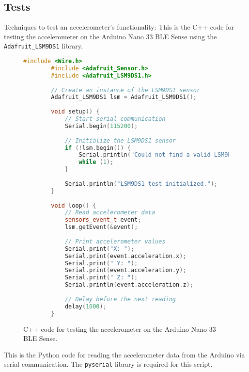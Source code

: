 \subsection{Tests}
Techniques to test an accelerometer’s functionality:
This is the C++ code for testing the accelerometer on the Arduino Nano 33 BLE Sense using the \texttt{Adafruit\_LSM9DS1} library. 

\begin{figure}[h!]
	\centering
	\begin{lstlisting}[style=pythonstyle ,language=C++, caption={Testing the accelerometer}, label={lst:arduino_accelerometer}]
		#include <Wire.h>
		#include <Adafruit_Sensor.h>
		#include <Adafruit_LSM9DS1.h>
		
		// Create an instance of the LSM9DS1 sensor
		Adafruit_LSM9DS1 lsm = Adafruit_LSM9DS1();
		
		void setup() {
			// Start serial communication
			Serial.begin(115200);
			
			// Initialize the LSM9DS1 sensor
			if (!lsm.begin()) {
				Serial.println("Could not find a valid LSM9DS1 sensor, check wiring!");
				while (1);
			}
			
			Serial.println("LSM9DS1 test initialized.");
		}
		
		void loop() {
			// Read accelerometer data
			sensors_event_t event;
			lsm.getEvent(&event);
			
			// Print accelerometer values
			Serial.print("X: ");
			Serial.print(event.acceleration.x);
			Serial.print(" Y: ");
			Serial.print(event.acceleration.y);
			Serial.print(" Z: ");
			Serial.println(event.acceleration.z);
			
			// Delay before the next reading
			delay(1000);
		}
	\end{lstlisting}
	\caption{C++ code for testing the accelerometer on the Arduino Nano 33 BLE Sense.}
	\label{lst:cpp_code}
\end{figure}

This is the Python code for reading the accelerometer data from the Arduino via serial communication. The \texttt{pyserial} library is required for this script.

